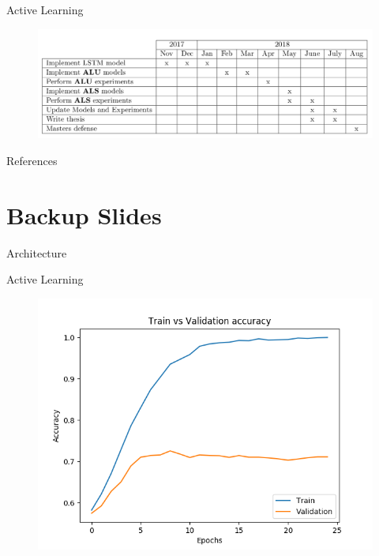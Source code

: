 \documentclass[10pt]{beamer}
\begin{document}
\begin{frame}[fragile]{Active Learning}
    \begin{figure}[htp]
        \centering
        \includegraphics[scale=0.22]{images/roadmap.png}
    \end{figure}
\end{frame}

\begin{frame}[allowframebreaks]{References}
  
  
\end{frame}

\section{Backup Slides}

\begin{frame}[fragile]{Architecture}
    
\end{frame}

\begin{frame}[fragile]{Active Learning}
    \begin{figure}[htp]
        \centering
        \includegraphics[scale=0.6]{images/parcial_results.png}
    \end{figure}
\end{frame}
\end{document}
